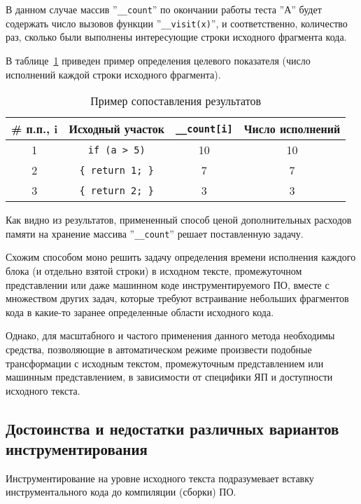 В данном случае массив ''\lstinline{__count}'' по окончании работы теста ''А'' будет содержать число вызовов функции ''\lstinline{__visit(x)}'', и соответственно, количество раз, сколько были выполнены интересующие строки исходного фрагмента кода.

В таблице~\ref{table:insrtExampleResults} приведен пример определения целевого показателя (число исполнений каждой строки исходного фрагмента).
\begin{table}[H]
  \captionsetup{skip=5pt}
  \caption{Пример сопоставления результатов}
  \label{table:insrtExampleResults}
  \centering
  \begin{tabular}{|c|c|c|c|}
    \hline
    \# п.п., i  & Исходный участок            & \lstinline!__count[i]!  & Число исполнений  \\ \hline
    1           & \lstinline!if (a > 5)!      & 10                      & 10                \\ \hline
    2           & \lstinline!{ return 1; }!   & 7                       & 7                 \\ \hline
    3           & \lstinline!{ return 2; }!   & 3                       & 3                 \\ \hline
  \end{tabular}
\end{table}

Как видно из результатов, примененный способ ценой дополнительных расходов памяти на хранение массива ''\lstinline{__count}'' решает поставленную задачу.

Схожим способом моно решить задачу определения времени исполнения каждого блока (и отдельно взятой строки) в исходном тексте, промежуточном представлении или даже машинном коде инструментируемого ПО, вместе с множеством других задач, которые требуют встраивание небольших фрагментов кода в какие-то заранее определенные области исходного кода.

Однако, для масштабного и частого применения данного метода необходимы средства, позволяющие в автоматическом режиме произвести подобные трансформации с исходным текстом, промежуточным представлением или машинным представлением, в зависимости от специфики ЯП и доступности исходного текста.

\subsection{Достоинства и недостатки различных вариантов инструментирования}
Инструментирование на уровне исходного текста подразумевает вставку инструментального кода до компиляции (сборки) ПО.

